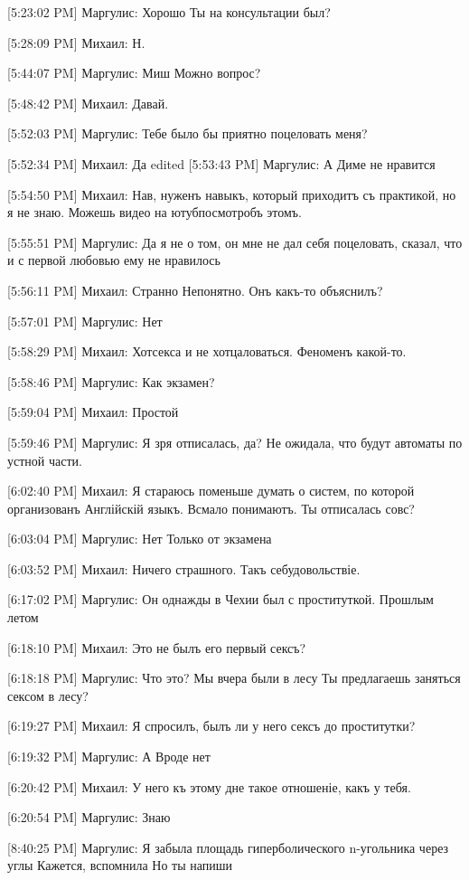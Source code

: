 \documentclass{article}
\newcommand{\yat}{{\fontencoding{X2}\selectfont\cyryat}} %
\begin{document}
[5:23:02 PM] Маргулис:
Хорошо
 Ты на консультации был?

[5:28:09 PM] Михаил:
Н.

[5:44:07 PM] Маргулис:
Миш
 Можно вопрос?

[5:48:42 PM] Михаил:
Давай.

[5:52:03 PM] Маргулис:
Тебе было бы приятно поцеловать меня?

[5:52:34 PM] Михаил:
Да
edited 
[5:53:43 PM] Маргулис:
А Диме не нравится

[5:54:50 PM] Михаил:
Нав, нуженъ навыкъ, который приходитъ съ практикой, но я не знаю.
 Можешь видео на ютуб\yat посмотр объ этомъ.

[5:55:51 PM] Маргулис:
Да я не о том, он мне не дал себя поцеловать, сказал, что и с первой любовью ему не нравилось

[5:56:11 PM] Михаил:
Странно
 Непонятно. Онъ какъ-то объяснилъ?

[5:57:01 PM] Маргулис:
Нет

[5:58:29 PM] Михаил:
Хот секса и не хот цаловаться. Феноменъ какой-то.

[5:58:46 PM] Маргулис:
Как экзамен?

[5:59:04 PM] Михаил:
Простой

[5:59:46 PM] Маргулис:
Я зря отписалась, да?
 Не ожидала, что будут автоматы по устной части.

[6:02:40 PM] Михаил:
Я стараюсь поменьше думать о систем\yat, по которой организованъ Англійскій языкъ. Вс\yat мало понимаютъ. Ты отписалась совс?

[6:03:04 PM] Маргулис:
Нет
 Только от экзамена

[6:03:52 PM] Михаил:
Ничего страшного. Такъ себ\yat удовольствіе.

[6:17:02 PM] Маргулис:
Он однажды в Чехии был с проституткой.
 Прошлым летом

[6:18:10 PM] Михаил:
Это не былъ его первый сексъ?

[6:18:18 PM] Маргулис:
Что это?
 Мы вчера были в лесу
 Ты предлагаешь заняться сексом в лесу?

[6:19:27 PM] Михаил:
Я спросилъ, былъ ли у него сексъ до проститутки?

[6:19:32 PM] Маргулис:
А
 Вроде нет

[6:20:42 PM] Михаил:
У него къ этому д не такое отношеніе, какъ у тебя.

[6:20:54 PM] Маргулис:
Знаю

[8:40:25 PM] Маргулис:
Я забыла площадь гиперболического n-угольника через углы
 Кажется, вспомнила
 Но ты напиши
\end{document}
